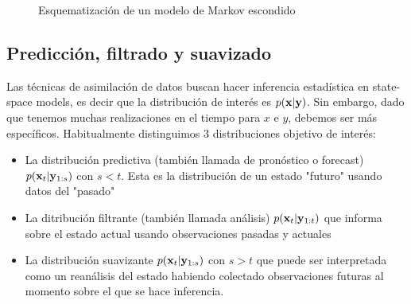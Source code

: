 \begin{figure}
    \centering
    \caption{Esquematización de un modelo de Markov escondido} \label{dia:hmm}
\end{figure}

\subsection{Predicción, filtrado y suavizado}

Las técnicas de asimilación de datos buscan hacer inferencia estadística en state-space models, es decir que la distribución de interés es $p(\mathbf{x} | \mathbf{y})$. Sin embargo, dado que tenemos muchas realizaciones en el tiempo para $x$ e $y$, debemos ser más específicos. Habitualmente distinguimos 3 distribuciones objetivo de interés:
\begin{itemize}
    \item La distribución predictiva (también llamada de pronóstico o forecast) $p(\mathbf{x}_t | \mathbf{y}_{1:s})$ con $s < t$. Esta es la distribución de un estado "futuro" usando datos del "pasado"
    \item La ditribución filtrante (también llamada análisis) $p(\mathbf{x}_t | \mathbf{y}_{1:t})$ que informa sobre el estado actual usando observaciones pasadas y actuales
    \item La distribución suavizante $p(\mathbf{x}_t | \mathbf{y}_{1:s})$ con $s > t$ que puede ser interpretada como un reanálisis del estado habiendo colectado observaciones futuras al momento sobre el que se hace inferencia.
\end{itemize}

